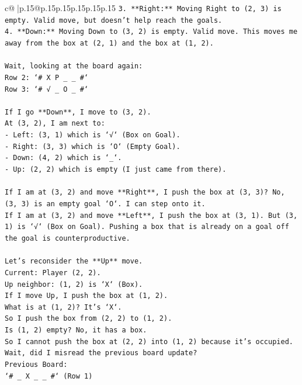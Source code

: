 \documentclass{article}
\begin{document}
{\begin{supertabular}{c@{$\;$}|p{.15\linewidth}@{}p{.15\linewidth}p{.15\linewidth}p{.15\linewidth}p{.15\linewidth}p{.15\linewidth}}
{{{\texttt{3.  **Right:** Moving Right to (2, 3) is empty. Valid move, but doesn't help reach the goals.} \\
\texttt{4.  **Down:** Moving Down to (3, 2) is empty. Valid move. This moves me away from the box at (2, 1) and the box at (1, 2).} \\
\\ 
\texttt{Wait, looking at the board again:} \\
\texttt{Row 2: `\# X P \_ \_ \#`} \\
\texttt{Row 3: `\# √ \_ O \_ \#`} \\
\\ 
\texttt{If I go **Down**, I move to (3, 2).} \\
\texttt{At (3, 2), I am next to:} \\
\texttt{{-} Left: (3, 1) which is `√` (Box on Goal).} \\
\texttt{{-} Right: (3, 3) which is `O` (Empty Goal).} \\
\texttt{{-} Down: (4, 2) which is `\_`.} \\
\texttt{{-} Up: (2, 2) which is empty (I just came from there).} \\
\\ 
\texttt{If I am at (3, 2) and move **Right**, I push the box at (3, 3)? No, (3, 3) is an empty goal `O`. I can step onto it.} \\
\texttt{If I am at (3, 2) and move **Left**, I push the box at (3, 1). But (3, 1) is `√` (Box on Goal). Pushing a box that is already on a goal off the goal is counterproductive.} \\
\\ 
\texttt{Let's reconsider the **Up** move.} \\
\texttt{Current: Player (2, 2).} \\
\texttt{Up neighbor: (1, 2) is `X` (Box).} \\
\texttt{If I move Up, I push the box at (1, 2).} \\
\texttt{What is at (1, 2)? It's `X`.} \\
\texttt{So I push the box from (2, 2) to (1, 2).} \\
\texttt{Is (1, 2) empty? No, it has a box.} \\
\texttt{So I cannot push the box at (2, 2) into (1, 2) because it's occupied.} \\
\texttt{Wait, did I misread the previous board update?} \\
\texttt{Previous Board:} \\
\texttt{`\# \_ X \_ \_ \#` (Row 1)} \\
}}}
\end{supertabular}}
\end{document}
